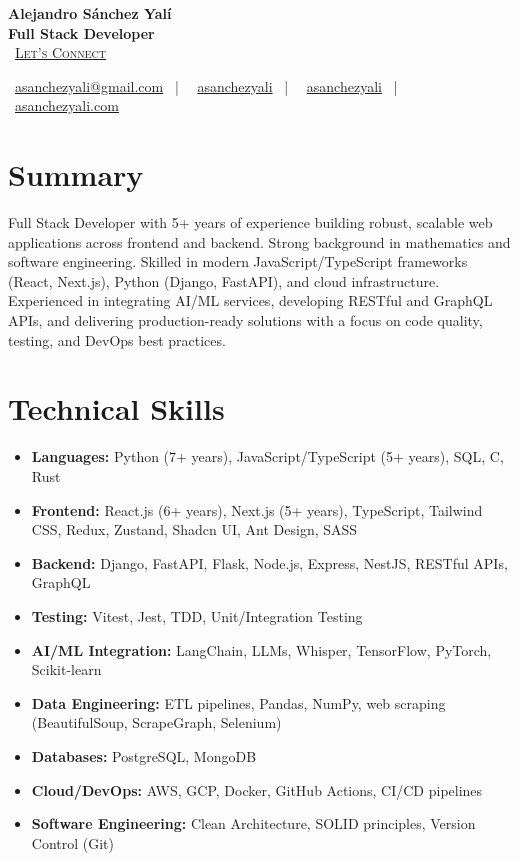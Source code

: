 \documentclass[letterpaper,11pt]{article}
\newcommand{\normalfaCalendar}{{\mdseries\faCalendar}}
\newcommand{\normalfaEnvelope}{{\mdseries\faEnvelope}}
\newcommand{\normalfaLinkedin}{{\mdseries\faLinkedin}}
\newcommand{\normalfaGithub}{{\mdseries\faGithub}}
\newcommand{\normalfaGlobe}{{\mdseries\faGlobe}}
\begin{document}
\begin{center}
\textbf{\Huge Alejandro Sánchez Yalí}\\[0.2em]
\textbf{\Large Full Stack Developer}\\[0.4em]
\small
\normalfaCalendar\ \href{https://cal.com/asanchezyali/full-time-opportunities}{\textsc{Let's Connect}}

\vspace{0.8em}
\normalfaEnvelope\ \href{mailto:asanchezyali@gmail.com}{asanchezyali@gmail.com}  ~|~
\normalfaLinkedin\ \href{https://www.linkedin.com/in/asanchezyali}{asanchezyali} ~|~
\normalfaGithub\ \href{https://github.com/asanchezyali}{asanchezyali}  ~|~
\normalfaGlobe\ \href{https://asanchezyali.com}{asanchezyali.com}
\end{center}

\section{Summary}
Full Stack Developer with 5+ years of experience building robust, scalable web applications across frontend and backend. Strong background in mathematics and software engineering. Skilled in modern JavaScript/TypeScript frameworks (React, Next.js), Python (Django, FastAPI), and cloud infrastructure. Experienced in integrating AI/ML services, developing RESTful and GraphQL APIs, and delivering production-ready solutions with a focus on code quality, testing, and DevOps best practices.

\section{Technical Skills}
\begin{itemize}[leftmargin=*, itemsep=0pt]
  \item \textbf{Languages:} Python (7+ years), JavaScript/TypeScript (5+ years), SQL, C, Rust
  \item \textbf{Frontend:} React.js (6+ years), Next.js (5+ years), TypeScript, Tailwind CSS, Redux, Zustand, Shadcn UI, Ant Design, SASS
  \item \textbf{Backend:} Django, FastAPI, Flask, Node.js, Express, NestJS, RESTful APIs, GraphQL
  \item \textbf{Testing:} Vitest, Jest, TDD, Unit/Integration Testing
  \item \textbf{AI/ML Integration:} LangChain, LLMs, Whisper, TensorFlow, PyTorch, Scikit-learn
  \item \textbf{Data Engineering:} ETL pipelines, Pandas, NumPy, web scraping (BeautifulSoup, ScrapeGraph, Selenium)
  \item \textbf{Databases:} PostgreSQL, MongoDB
  \item \textbf{Cloud/DevOps:} AWS, GCP, Docker, GitHub Actions, CI/CD pipelines
  \item \textbf{Software Engineering:} Clean Architecture, SOLID principles, Version Control (Git)
\end{itemize}
\end{document}
